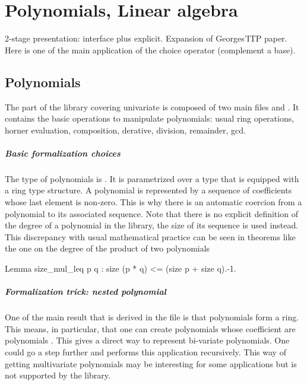 \chapter{Polynomials, Linear algebra}

2-stage presentation: interface plus explicit. Expansion of
Georges'ITP paper. Here is one of the main application of the choice
operator (complement a base).


\section{Polynomials}
\label{sec:poly}

The part of the library covering univariate is composed of two main files
 and . It contains the basic operations to manipulate
polynomials: usual ring operations, horner evaluation, composition, derative, division, remainder, gcd.

\paragraph{Basic formalization choices} 
The type of polynomials is . It is parametrized over a type 
that is equipped with a ring type structure.
A polynomial is represented by a sequence of coefficients whose last element is non-zero.
This is why there is an automatic coercion from a polynomial to its associated sequence.
Note that there is no explicit definition of the degree of a polynomial in the library, 
the size of  its sequence is used instead. This discrepancy with usual mathematical practice can
be seen in theorems like the one on the degree of the product of two 
polynomials 

\begin{coq}{}{}
Lemma size_mul_leq p q : size (p * q) <= (size p + size q).-1.
\end{coq}
\paragraph{Formalization trick: nested polynomial}
One of the  main result that is derived in the file  is that polynomials
form a ring. This means, in particular, that one can create polynomials 
whose coefficient are polynomials . This gives a direct way to 
represent bi-variate polynomials. One could go a step further and performs this application
recursively.
This way of getting multivariate polynomials may be interesting for some applications
but is not supported by the library.

